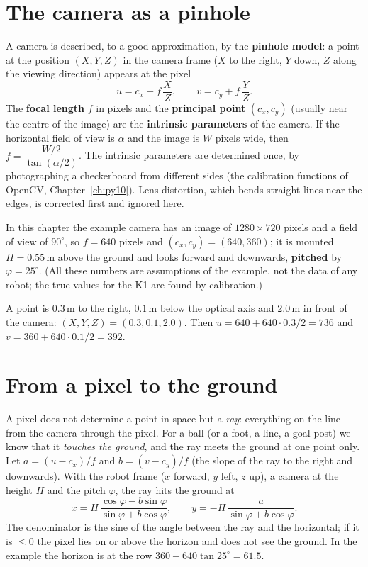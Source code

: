 \section*{The camera as a pinhole}
A camera is described, to a good approximation, by the \textbf{pinhole model}: a point at the position $(X,Y,Z)$ in the camera frame ($X$ to the right, $Y$ down, $Z$ along the viewing direction) appears at the pixel
\[
u=c_x+f\,\frac{X}{Z},\qquad v=c_y+f\,\frac{Y}{Z}.
\]
The \textbf{focal length} $f$ in pixels and the \textbf{principal point} $(c_x,c_y)$ (usually near the centre of the image) are the \textbf{intrinsic parameters} of the camera. If the horizontal field of view is $\alpha$ and the image is $W$ pixels wide, then $f=\dfrac{W/2}{\tan(\alpha/2)}$. The intrinsic parameters are determined once, by photographing a checkerboard from different sides (the calibration functions of OpenCV, Chapter~\ref{ch:py10}). Lens distortion, which bends straight lines near the edges, is corrected first and ignored here.

In this chapter the example camera has an image of $1280\times720$ pixels and a field of view of $90^{\circ}$, so $f=640$ pixels and $(c_x,c_y)=(640,360)$; it is mounted $H=0.55$\,m above the ground and looks forward and downwards, \textbf{pitched} by $\varphi=25^{\circ}$. (All these numbers are assumptions of the example, not the data of any robot; the true values for the K1 are found by calibration.)

\begin{example}
A point is $0.3$\,m to the right, $0.1$\,m below the optical axis and $2.0$\,m in front of the camera: $(X,Y,Z)=(0.3,0.1,2.0)$. Then $u=640+640\cdot0.3/2=736$ and $v=360+640\cdot0.1/2=392$.
\end{example}

\section*{From a pixel to the ground}
A pixel does not determine a point in space but a \emph{ray}: everything on the line from the camera through the pixel. For a ball (or a foot, a line, a goal post) we know that it \emph{touches the ground}, and the ray meets the ground at one point only. Let $a=(u-c_x)/f$ and $b=(v-c_y)/f$ (the slope of the ray to the right and downwards). With the robot frame ($x$ forward, $y$ left, $z$ up), a camera at the height $H$ and the pitch $\varphi$, the ray hits the ground at
\[
x=H\,\frac{\cos\varphi-b\sin\varphi}{\sin\varphi+b\cos\varphi},\qquad
y=-H\,\frac{a}{\sin\varphi+b\cos\varphi}.
\]
The denominator is the sine of the angle between the ray and the horizontal; if it is $\le0$ the pixel lies on or above the horizon and does not see the ground. In the example the horizon is at the row $360-640\tan25^{\circ}=61.5$.

